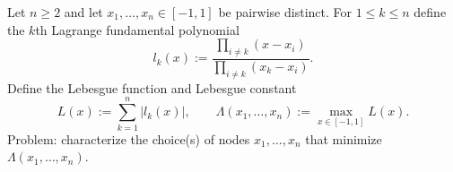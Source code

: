 Let $n\ge 2$ and let $x_1,\dots,x_n\in[-1,1]$ be pairwise distinct.
For $1\le k\le n$ define the $k$th Lagrange fundamental polynomial
\[
 l_k(x):=\frac{\prod_{i\ne k}(x-x_i)}{\prod_{i\ne k}(x_k-x_i)}.
\]
Define the Lebesgue function and Lebesgue constant
\[
 L(x):=\sum_{k=1}^n |l_k(x)|,\qquad \Lambda(x_1,\dots,x_n):=\max_{x\in[-1,1]} L(x).
\]
Problem: characterize the choice(s) of nodes $x_1,\dots,x_n$ that minimize $\Lambda(x_1,\dots,x_n)$.
